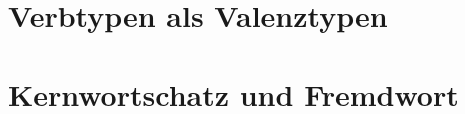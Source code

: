 \documentclass[handout,aspectratio=1610,dvipsnames]{beamer}
\begin{document}
  \section{Verbtypen als Valenztypen}
  \let\woopsi\section\let\section\subsection\let\subsection\subsubsection
  
  \let\subsection\section\let\section\woopsi
  
  \section{Kernwortschatz und Fremdwort}
  \let\woopsi\section\let\section\subsection\let\subsection\subsubsection
  
  \let\subsection\section\let\section\woopsi
\end{document}
